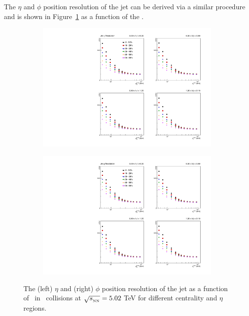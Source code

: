 The $\eta$ and $\phi$ position resolution of the jet can be derived via a similar procedure and is shown in Figure~\ref{fig:jet_posResolution} as a function of the \pttruth.



\begin{figure}
\centering
\begin{subfigure}{.45\textwidth}
  \centering
  \includegraphics[width=\linewidth]{figures/setup/jet_res_eta_r04.pdf}
          \caption{}
\end{subfigure}
\begin{subfigure}{.45\textwidth}  
  \centering
  \includegraphics[width=\linewidth]{figures/setup/jet_res_phi_r04.pdf}
          \caption{}
\end{subfigure}
\caption{The (left) $\eta$ and (right) $\phi$ position resolution of the jet as a function of \pttruth\ in \pbpb\ collisions at $\mbox{$\sqrt{s_{_\text{NN}}}$} = 5.02$ TeV for different centrality and $\eta$ regions.}
\label{fig:jet_posResolution}
\end{figure}




